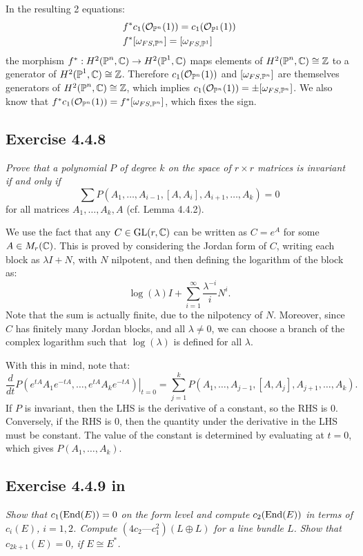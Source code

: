 \documentclass{article}
\begin{document}
In the resulting 2 equations:
\begin{align*}
f^* &c_1(\mathcal{O}_{\operatorname{\mathbb{P}}^n}(1)) = c_1(\mathcal{O}_{\operatorname{\mathbb{P}}^1}(1)) \\
f^* &[\omega_{FS,\operatorname{\mathbb{P}}^n}] = [\omega_{FS,\operatorname{\mathbb{P}}^1}]
\end{align*}
the morphism $f^* : H^2(\operatorname{\mathbb{P}}^n,\mathbb{C}) \to H^2(\operatorname{\mathbb{P}}^1,\mathbb{C})$ maps elements of $H^2(\operatorname{\mathbb{P}}^n,\mathbb{C}) \cong \mathbb{Z}$ to a generator of
$H^2(\operatorname{\mathbb{P}}^1,\mathbb{C}) \cong \mathbb{Z}$. Therefore $c_1(\mathcal{O}_{\operatorname{\mathbb{P}}^n}(1))$ and $[\omega_{FS,\operatorname{\mathbb{P}}^n}]$ are themselves
generators of $H^2(\operatorname{\mathbb{P}}^n,\mathbb{C}) \cong \mathbb{Z}$, which implies $c_1(\mathcal{O}_{\operatorname{\mathbb{P}}^n}(1)) = \pm [\omega_{FS,\operatorname{\mathbb{P}}^n}]$.
We also know that $f^* c_1(\mathcal{O}_{\operatorname{\mathbb{P}}^n}(1)) = f^* [\omega_{FS,\operatorname{\mathbb{P}}^n}]$, which fixes the sign.


\subsection*{Exercise 4.4.8}
\emph{Prove that a polynomial $P$ of degree $k$ on the space of $r\times r$ matrices is invariant if and only if}
\[ \sum P(A_1, \dots, A_{i-1}, [A,A_i] , A_{i+1}, \dots, A_k) = 0 \]
{for all matrices $A_1, \dots, A_k, A$ (cf. Lemma 4.4.2).}
\vspace{3mm}

We use the fact that any $C \in \operatorname{GL}(r,\mathbb{C})$ can be written as $C = e^A$ for some $A \in M_r(\mathbb{C})$. This is proved by
considering the Jordan form of $C$, writing each block as $\lambda I + N$, with $N$ nilpotent, and then defining the
logarithm of the block as: 
\[	\log (\lambda) I + \sum_{i=1}^{\infty} \frac{\lambda^{-i}}{i} N^i.  \]
Note that the sum is actually finite, due to the nilpotency of $N$. Moreover, since $C$ has finitely many Jordan blocks,
and all $\lambda \neq 0$, we can choose a branch of the complex logarithm such that $\log (\lambda)$ is defined for all
$\lambda$.

With this in mind, note that:
\[	\frac{d}{dt}\left. P(e^{tA}A_1e^{-tA}, \dots, e^{tA}A_k e^{-tA})\right|_{t=0} = 
\sum_{j=1}^k P(A_1, \dots, A_{j-1}, [A,A_j] , A_{j+1}, \dots, A_k).	\]
If $P$ is invariant, then the LHS is the derivative of a constant, so the RHS is 0. Conversely, if the RHS is 0,
then the quantity under the derivative in the LHS must be constant. The value of the constant is determined by evaluating
at $t=0$, which gives $P(A_1, \dots, A_k)$.



\subsection*{Exercise 4.4.9 in \cite{Huy}}
\emph{Show that $c_1(\operatorname{End}(E)) = 0$ on the form level and compute $c_2(\operatorname{End}(E))$ in
terms of $c_i(E)$, $i = 1,2$. Compute $(4c_2 — c_1^2)(L \oplus L)$ for a line bundle $L$. Show that
$c_{2k+1}(E) = 0$, if $E\cong E^*$.}
\vspace{3mm}
\end{document}
